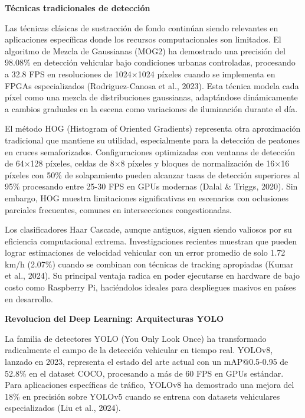 \documentclass[12pt,a4paper,oneside]{report}
\begin{document}
\textbf{Técnicas tradicionales de detección}

Las técnicas clásicas de sustracción de fondo continúan siendo relevantes en aplicaciones específicas donde los recursos computacionales son limitados. El algoritmo de Mezcla de Gaussianas (MOG2) ha demostrado una precisión del 98.08\% en detección vehicular bajo condiciones urbanas controladas, procesando a 32.8 FPS en resoluciones de 1024\ensuremath{\times}1024 píxeles cuando se implementa en FPGAs especializados (Rodriguez-Canosa et al., 2023). Esta técnica modela cada píxel como una mezcla de distribuciones gaussianas, adaptándose dinámicamente a cambios graduales en la escena como variaciones de iluminación durante el día.

El método HOG (Histogram of Oriented Gradients) representa otra aproximación tradicional que mantiene su utilidad, especialmente para la detección de peatones en cruces semaforizados. Configuraciones optimizadas con ventanas de detección de 64\ensuremath{\times}128 píxeles, celdas de 8\ensuremath{\times}8 píxeles y bloques de normalización de 16\ensuremath{\times}16 píxeles con 50\% de solapamiento pueden alcanzar tasas de detección superiores al 95\% procesando entre 25-30 FPS en GPUs modernas (Dalal \& Triggs, 2020). Sin embargo, HOG muestra limitaciones significativas en escenarios con oclusiones parciales frecuentes, comunes en intersecciones congestionadas.

Los clasificadores Haar Cascade, aunque antiguos, siguen siendo valiosos por su eficiencia computacional extrema. Investigaciones recientes muestran que pueden lograr estimaciones de velocidad vehicular con un error promedio de solo 1.72 km/h (2.07\%) cuando se combinan con técnicas de tracking apropiadas (Kumar et al., 2024). Su principal ventaja radica en poder ejecutarse en hardware de bajo costo como Raspberry Pi, haciéndolos ideales para despliegues masivos en países en desarrollo.

\textbf{Revolucion del Deep Learning: Arquitecturas YOLO}

La familia de detectores YOLO (You Only Look Once) ha transformado radicalmente el campo de la detección vehicular en tiempo real. YOLOv8, lanzado en 2023, representa el estado del arte actual con un mAP@0.5-0.95 de 52.8\% en el dataset COCO, procesando a más de 60 FPS en GPUs estándar. Para aplicaciones específicas de tráfico, YOLOv8 ha demostrado una mejora del 18\% en precisión sobre YOLOv5 cuando se entrena con datasets vehiculares especializados (Liu et al., 2024).
\end{document}
